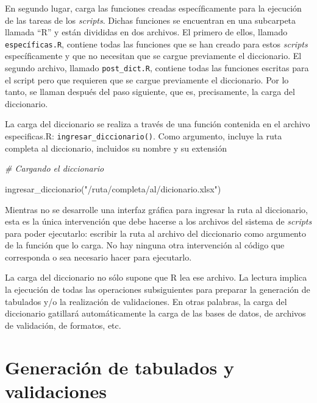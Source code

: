 \documentclass[
  spanish,
]{book}
\newenvironment{Shaded}{\begin{snugshade}}{\end{snugshade}}
\newcommand{\CommentTok}[1]{\textcolor[rgb]{0.56,0.35,0.01}{\textit{#1}}}
\newcommand{\FunctionTok}[1]{\textcolor[rgb]{0.00,0.00,0.00}{#1}}
\newcommand{\NormalTok}[1]{#1}
\newcommand{\StringTok}[1]{\textcolor[rgb]{0.31,0.60,0.02}{#1}}
\begin{document}
En segundo lugar, carga las funciones creadas específicamente para la ejecución de las tareas de los \emph{scripts}. Dichas funciones se encuentran en una subcarpeta llamada ``R'' y están divididas en dos archivos. El primero de ellos, llamado \texttt{específicas.R}, contiene todas las funciones que se han creado para estos \emph{scripts} específicamente y que no necesitan que se cargue previamente el diccionario. El segundo archivo, llamado \texttt{post\_dict.R}, contiene todas las funciones escritas para el script pero que requieren que se cargue previamente el diccionario. Por lo tanto, se llaman después del paso siguiente, que es, precisamente, la carga del diccionario.

La carga del diccionario se realiza a través de una función contenida en el archivo especificas.R: \texttt{ingresar\_diccionario()}. Como argumento, incluye la ruta completa al diccionario, incluidos su nombre y su extensión

\begin{Shaded}
\begin{Highlighting}[]
\CommentTok{\# Cargando el diccionario }

\FunctionTok{ingresar\_diccionario}\NormalTok{(}\StringTok{"/ruta/completa/al/dicionario.xlsx"}\NormalTok{)}
\end{Highlighting}
\end{Shaded}

Mientras no se desarrolle una interfaz gráfica para ingresar la ruta al diccionario, esta es la única intervención que debe hacerse a los archivos del sistema de \emph{scripts} para poder ejecutarlo: escribir la ruta al archivo del diccionario como argumento de la función que lo carga. No hay ninguna otra intervención al código que corresponda o sea necesario hacer para ejecutarlo.

La carga del diccionario no sólo supone que R lea ese archivo. La lectura implica la ejecución de todas las operaciones subsiguientes para preparar la generación de tabulados y/o la realización de validaciones. En otras palabras, la carga del diccionario gatillará automáticamente la carga de las bases de datos, de archivos de validación, de formatos, etc.

\hypertarget{generaciuxf3n-de-tabulados-y-validaciones}{%
\section{Generación de tabulados y validaciones}\label{generaciuxf3n-de-tabulados-y-validaciones}}
\end{document}
